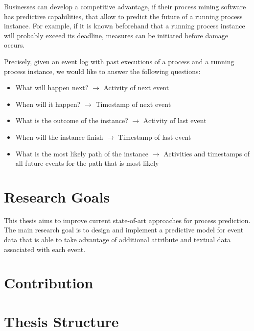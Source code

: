 Businesses can develop a competitive advantage, if their process mining software has predictive capabilities, that allow to predict the future of a running process instance.
For example, if it is known beforehand that a running process instance will probably exceed
its deadline, measures can be initiated before damage occurs.

Precisely, given an event log with past executions of a process and a running process instance, we would like to answer the following questions:

\begin{itemize}
	\item What will happen next? $\rightarrow$ Activity of next event
	\item When will it happen? $\rightarrow$ Timestamp of next event
	\item What is the outcome of the instance? $\rightarrow$ Activity of last event
	\item When will the instance finish $\rightarrow$ Timestamp of last event
	\item What is the most likely path of the instance $\rightarrow$  Activities and timestamps of all future events for the path that is most likely
\end{itemize}



\section{Research Goals}

This thesis aims to improve current state-of-art approaches for process prediction.
The main research goal is to design and implement a predictive model for event data that is able to take advantage of additional attribute and textual data associated with each event. 

\section{Contribution}



\section{Thesis Structure}

